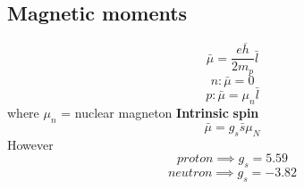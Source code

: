 \subsection{Magnetic moments}
\[
    \bar{\mu} = \frac{e \overline{h} }{2 m_{p} } \bar{l}
\]
\[
    n: \bar{\mu} = 0
\]
\[
    p: \bar{\mu} = \mu_n \bar{l}
\]
where $\mu_n$ = nuclear magneton\adfj
\textbf{Intrinsic}  \textbf{spin} 
\[
    \bar{\mu} = g_{s} \bar{s} \mu_{N} 
\]
However
\[
    proton \implies  g_s = 5.59
\]
\[
    neutron \implies g_s = -3.82
\]
